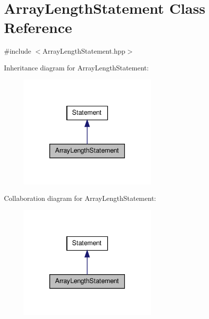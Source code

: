 \hypertarget{class_array_length_statement}{\section{Array\-Length\-Statement Class Reference}
\label{class_array_length_statement}
}


{\ttfamily \#include $<$Array\-Length\-Statement.\-hpp$>$}



Inheritance diagram for Array\-Length\-Statement\-:
\nopagebreak
\begin{figure}[H]
\begin{center}
\leavevmode
\includegraphics[width=194pt]{class_array_length_statement__inherit__graph}
\end{center}
\end{figure}


Collaboration diagram for Array\-Length\-Statement\-:
\nopagebreak
\begin{figure}[H]
\begin{center}
\leavevmode
\includegraphics[width=194pt]{class_array_length_statement__coll__graph}
\end{center}
\end{figure}
